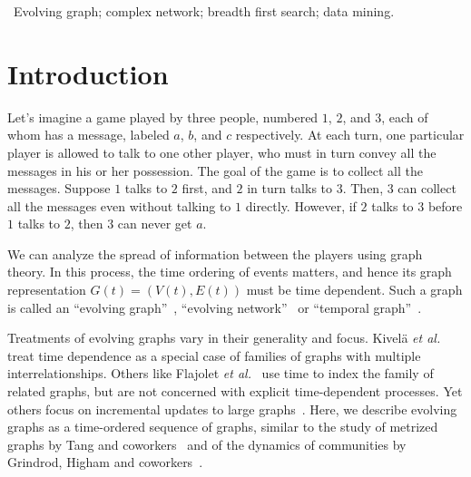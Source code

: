 \documentclass[10pt,conference,compsocconf]{IEEEtran}
\theoremstyle{definition}
\begin{document}
\begin{IEEEkeywords}
~Evolving graph; complex network; breadth first search; data mining.
\end{IEEEkeywords}

%
\IEEEpeerreviewmaketitle

\section{Introduction}

Let's imagine a game played by three people, numbered $1$, $2$, and $3$,
each of whom has a message, labeled $a$, $b$, and $c$ respectively.
At each turn, one particular player is allowed to talk to one other player,
who must in turn convey all the messages in his or her possession.
The goal of the game is to collect all the messages.
Suppose $1$ talks to $2$ first, and $2$ in turn talks to $3$.
Then, $3$ can collect all the messages even without talking to $1$ directly.
However, if $2$ talks to $3$ before $1$ talks to $2$, then
$3$ can never get $a$.

We can analyze the spread of information between the players using graph
theory. In this process, the time ordering of events matters, and hence its
graph representation $G(t) = (V(t), E(t))$ must be time dependent.
Such a graph is called an ``evolving graph''~\cite{fkp89,bkmu12},
``evolving network''~\cite{bfgm08} or ``temporal graph''~\cite{tmml09}.

Treatments of evolving graphs vary in their generality and focus.
Kivel\"a \textit{et al.}~\cite{kabg14} treat time dependence as a special
case of families of graphs with multiple interrelationships.
Others like Flajolet \textit{et al.}~\cite{fkp89} use time to index the family
of related graphs, but are not concerned with explicit time-dependent processes.
Yet others focus on incremental updates to large graphs~\cite{bkmu12}.
Here, we describe evolving graphs as a time-ordered sequence of graphs, similar
to the study of metrized graphs by Tang and coworkers~\cite{ntmm13,tmml09,tsmm09,tmml10} and of
the dynamics of communities by Grindrod, Higham and coworkers~\cite{gphe11,grihig13}.
\end{document}
